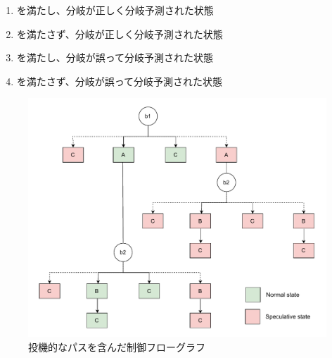 \begin{enumerate}[label=(\arabic*)]
  \item {} を満たし、分岐が正しく分岐予測された状態
  \item {} を満たさず、分岐が正しく分岐予測された状態
  \item {} を満たし、分岐が誤って分岐予測された状態
  \item {} を満たさず、分岐が誤って分岐予測された状態
\end{enumerate}

\begin{figure}[tb]
  \centering
  \includegraphics[width=\linewidth]{img/klee_CFG.drawio.pdf}
  \caption{投機的なパスを含んだ制御フローグラフ}
  \label{fig:klee_cfg}
\end{figure}


